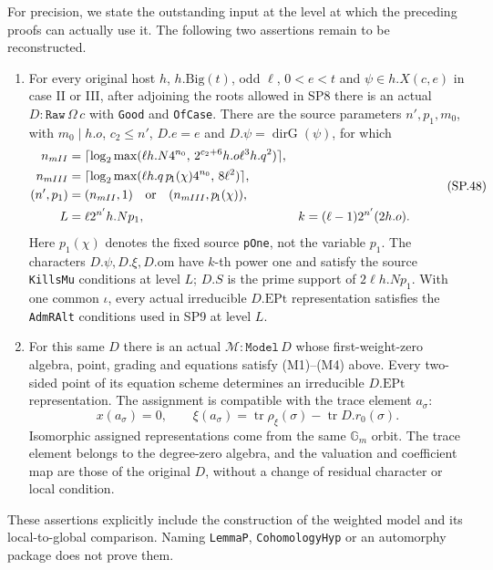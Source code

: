 For precision, we state the outstanding input at the level at which
the preceding proofs can actually use it.  The following two
assertions remain to be reconstructed.
\begin{enumerate}
\item[(G1)] For every original host $h$, $h.\mathrm{Big}(t)$,
odd $\ell$, $0<e<t$ and $\psi\in h.X(c,e)$ in case II or III,
after adjoining the roots allowed in SP8 there is an actual
$D:\texttt{Raw}\,\Omega\,c$ with \texttt{Good} and
\texttt{OfCase}.  There are the source parameters $n',p_1,m_0$,
with $m_0\mid h.o$, $c_2\le n'$, $D.e=e$ and
$D.\psi=\operatorname{dirG}(\psi)$, for which
\[
 \begin{aligned}
 n_{
m II}&=\lceil\log_2\max
       (\ell h.N4^{n_0},\,2^{c_2+6}h.o\ell^3h.q^2)\rceil,\\
 n_{
m III}&=\lceil\log_2\max
       (\ell h.q\,p_{\!1}(\chi)4^{n_0},\,8\ell^2)\rceil,\\
 (n',p_1)&=(n_{
m II},1)\quad\hbox{or}\quad
                  (n_{
m III},p_{\!1}(\chi)),\\
 L&=\ell 2^{n'}h.Np_1,
 & k&=(\ell-1)2^{n'}(2h.o).
 \end{aligned}
 \tag{SP.48}
\]
Here $p_{\!1}(\chi)$ denotes the fixed source \texttt{pOne}, not
the variable $p_1$.  The characters $D.\psi,D.\xi,D.\mathrm{om}$
have $k$-th power one and satisfy the source \texttt{KillsMu}
conditions at level $L$; $D.S$ is the prime support of
$2\ell h.Np_1$.  With one common $\iota$, every actual irreducible
$D.\mathrm{EPt}$ representation satisfies the \texttt{AdmRAlt}
conditions used in SP9 at level $L$.
\item[(G2)] For this same $D$ there is an actual
$\mathcal M:\texttt{Model}\,D$ whose first-weight-zero algebra,
point, grading and equations satisfy (M1)--(M4) above.  Every
two-sided point of its equation scheme determines an irreducible
$D.\mathrm{EPt}$ representation.  The assignment is compatible
with the trace element $a_\sigma$:
\[
 x(a_\sigma)=0,\qquad
 \xi(a_\sigma)=\operatorname{tr}\rho_\xi(\sigma)
                       -\operatorname{tr}D.r_0(\sigma).
 \tag{SP.49}
\]
Isomorphic assigned representations come from the same
$\mathbb G_m$ orbit.  The trace element belongs to the degree-zero
algebra, and the valuation and coefficient map are those of the
original $D$, without a change of residual character or local
condition.
\end{enumerate}
These assertions explicitly include the construction of the
weighted model and its local-to-global comparison.  Naming
\texttt{LemmaP}, \texttt{CohomologyHyp} or an automorphy package
does not prove them.

